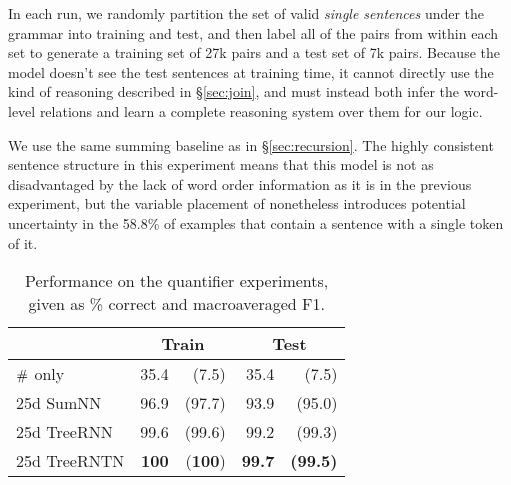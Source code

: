 

In each run, we randomly partition the set of valid \textit{single sentences} under the grammar into training and test, and then label all of the pairs from within each set to generate a training set of 27k pairs and a test set of 7k pairs. Because the model doesn't see the test sentences at training time, it cannot directly use the kind of reasoning described in \S\ref{sec:join}, and must instead both infer the word-level relations and learn a complete reasoning system over them for our logic. 

We use the same summing baseline as in \S\ref{sec:recursion}.
The highly consistent  sentence structure in this experiment means that this model
is not as disadvantaged by the lack of word order information as it is in the previous experiment, 
but the variable placement of   nonetheless introduces potential uncertainty in the 58.8\% 
of examples that contain a sentence with a single token of it.

\begin{table}[tp]
  \centering\small
    \begin{tabular}{ l r@{ \ }r r@{ \ }r }
    
    \toprule
    ~ & \multicolumn{2}{c}{Train} & \multicolumn{2}{c}{Test} \\
    \midrule
    $\mathbin{\#}$ only &	35.4 & (7.5)	& 35.4	& (7.5)\\
    25d SumNN	&	96.9&	(97.7)&	93.9&	(95.0)\\	
    25d TreeRNN	&	99.6&	(99.6)&	99.2&	(99.3)\\
    25d TreeRNTN	&	\textbf{100}&(\textbf{100})&	\textbf{99.7} & \textbf{(99.5)}\\
    \bottomrule
  \end{tabular}
  
  \caption{Performance on the quantifier experiments, given as \% correct and macroaveraged F1.}
  \label{qresultstable}
\end{table} 

